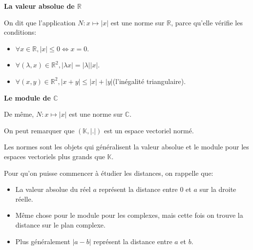 \documentclass{article}
\begin{document}
\begin{tcolorbox}[colback=cyan!5!white,colframe=cyan!75!black,title=Exemple 1.1]

\textbf{La valeur absolue de $\mathbb{R}$}

On dit que l'application $N: x \mapsto |x|$ est une norme sur $\mathbb{R}$, parce qu'elle vérifie les conditions:

\begin{itemize}
 \item $\forall x \in \mathbb{R}, |x| \leq 0 \Longleftrightarrow x = 0$.
 \item $\forall (\lambda, x) \in {\mathbb{R}}^{2}, |\lambda x| = |\lambda||x|$.
 \item $\forall (x, y) \in {\mathbb{R}}^{2}, |x+y| \leq |x|+|y|$(l'inégalité triangulaire).
\end{itemize}

\textbf{Le module de $\mathbb{C}$}

De même, $N: x \mapsto |x|$ est une norme sur $\mathbb{C}$.

On peut remarquer que $(\mathbb{K}, |.|)$ est un espace vectoriel normé.

\end{tcolorbox}

\begin{tcolorbox}[colback=yellow!5!white,colframe=yellow!75!black,title=Remarque 1.2]

Les normes sont les objets qui généralisent la valeur absolue et le module pour les espaces vectoriels plus grands que $\mathbb{K}$.

\end{tcolorbox}



\begin{tcolorbox}[colback=gray!5!white,colframe=gray!75!black,title=Rappel 1.1]

Pour qu'on puisse commencer à étudier les distances, on rappelle que:

\begin{itemize}
 \item La valeur absolue du réel $a$ représent la distance entre 0 et $a$ sur la droite réelle.
 \item Même chose pour le module pour les complexes, mais cette fois on trouve la distance sur le plan complexe.
 \item Plus généralement $|a-b|$ représent la distance entre $a$ et $b$.
\end{itemize}

\end{tcolorbox}
\end{document}
